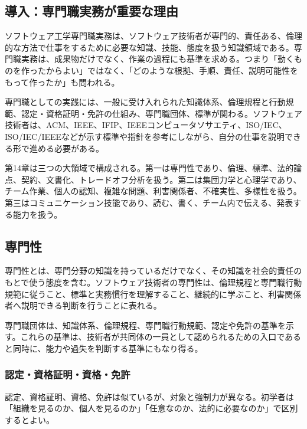 \documentclass[a4paper,11pt]{ltjsarticle}
\numberwithin{figure}{section}
\numberwithin{table}{section}
\begin{document}
\subsection*{導入：専門職実務が重要な理由}


ソフトウェア工学専門職実務は、ソフトウェア技術者が専門的、責任ある、倫理的な方法で仕事をするために必要な知識、技能、態度を扱う知識領域である。専門職実務は、成果物だけでなく、作業の過程にも基準を求める。つまり「動くものを作ったからよい」ではなく、「どのような根拠、手順、責任、説明可能性をもって作ったか」も問われる。

専門職としての実践には、一般に受け入れられた知識体系、倫理規程と行動規範、認定・資格証明・免許の仕組み、専門職団体、標準が関わる。ソフトウェア技術者は、ACM、IEEE、IFIP、IEEEコンピュータソサエティ、ISO/IEC、ISO/IEC/IEEEなどが示す標準や指針を参考にしながら、自分の仕事を説明できる形で進める必要がある。

第14章は三つの大領域で構成される。第一は専門性であり、倫理、標準、法的論点、契約、文書化、トレードオフ分析を扱う。第二は集団力学と心理学であり、チーム作業、個人の認知、複雑な問題、利害関係者、不確実性、多様性を扱う。第三はコミュニケーション技能であり、読む、書く、チーム内で伝える、発表する能力を扱う。

\subsection*{専門性}


専門性とは、専門分野の知識を持っているだけでなく、その知識を社会的責任のもとで使う態度を含む。ソフトウェア技術者の専門性は、倫理規程と専門職行動規範に従うこと、標準と実務慣行を理解すること、継続的に学ぶこと、利害関係者へ説明できる判断を行うことに表れる。

専門職団体は、知識体系、倫理規程、専門職行動規範、認定や免許の基準を示す。これらの基準は、技術者が共同体の一員として認められるための入口であると同時に、能力や過失を判断する基準にもなり得る。

\subsubsection*{認定・資格証明・資格・免許}


認定、資格証明、資格、免許は似ているが、対象と強制力が異なる。初学者は「組織を見るのか、個人を見るのか」「任意なのか、法的に必要なのか」で区別するとよい。
\end{document}
